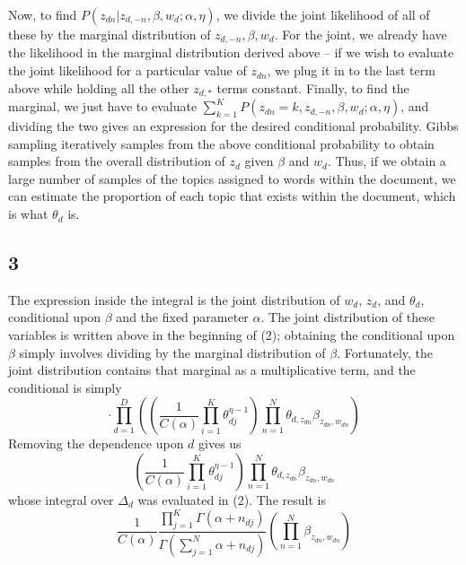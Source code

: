 \documentclass{article}
\begin{document}
Now, to find $P(z_{dn}|z_{d,-n},\beta,w_d;\alpha,\eta)$, we divide the joint likelihood of all of these by the marginal distribution of $z_{d,-n},\beta,w_d$. For the joint, we already have the likelihood in the marginal distribution derived above -- if we wish to evaluate the joint likelihood for a particular value of $z_{dn}$, we plug it in to the last term above while holding all the other $z_{d,*}$ terms constant. Finally, to find the marginal, we just have to evaluate $\sum_{k=1}^KP(z_{dn}=k,z_{d,-n},\beta,w_d;\alpha,\eta)$, and dividing the two gives an expression for the desired conditional probability.
Gibbs sampling iteratively samples from the above conditional probability to obtain samples from the overall distribution of $z_d$ given $\beta$ and $w_d$. Thus, if we obtain a large number of samples of the topics assigned to words within the document, we can estimate the proportion of each topic that exists within the document, which is what $\theta_d$ is.
\subsection*{3}
The expression inside the integral is the joint distribution of $w_d$, $z_d$, and $\theta_d$, conditional upon $\beta$ and the fixed parameter $\alpha$. The joint distribution of these variables is written above in the beginning of (2); obtaining the conditional upon $\beta$ simply involves dividing by the marginal distribution of $\beta$. Fortunately, the joint distribution contains that marginal as a multiplicative term, and the conditional is simply 
\[\cdot\prod_{d=1}^D\left(\left(\frac{1}{C(\alpha)}\prod_{i=1}^K\theta_{dj}^{\eta-1}\right)\prod_{n=1}^N\theta_{d,z_{dn}}\beta_{z_{dn},w_{dn}}\right)\]
Removing the dependence upon $d$ gives us
\[\left(\frac{1}{C(\alpha)}\prod_{i=1}^K\theta_{dj}^{\eta-1}\right)\prod_{n=1}^N\theta_{d,z_{dn}}\beta_{z_{dn},w_{dn}}\]
whose integral over $\Delta_d$ was evaluated in (2). The result is
\[\frac{1}{C(\alpha)}\frac{\prod_{j=1}^K\Gamma(\alpha+n_{dj})}{\Gamma(\sum_{j=1}^N\alpha+n_{dj})}\left(\prod_{n=1}^N\beta_{z_{dn},w_{dn}}\right)\]
\end{document}
